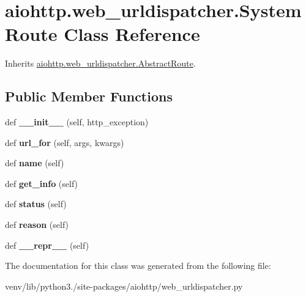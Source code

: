\hypertarget{classaiohttp_1_1web__urldispatcher_1_1_system_route}{}\section{aiohttp.\+web\+\_\+urldispatcher.\+System\+Route Class Reference}
\label{classaiohttp_1_1web__urldispatcher_1_1_system_route}


Inherits \hyperlink{classaiohttp_1_1web__urldispatcher_1_1_abstract_route}{aiohttp.\+web\+\_\+urldispatcher.\+Abstract\+Route}.

\subsection*{Public Member Functions}
\begin{DoxyCompactItemize}
\item 
\mbox{\label{classaiohttp_1_1web__urldispatcher_1_1_system_route_a6053bf8d2c9137e23233f72ac0ad2043}} 
def {\bfseries \+\_\+\+\_\+init\+\_\+\+\_\+} (self, http\+\_\+exception)
\item 
\mbox{\label{classaiohttp_1_1web__urldispatcher_1_1_system_route_aef2c28b3e6d68bb4a1e99d4c1686b421}} 
def {\bfseries url\+\_\+for} (self, args, kwargs)
\item 
\mbox{\label{classaiohttp_1_1web__urldispatcher_1_1_system_route_ac1e66622d61ce49226476097b1b94b00}} 
def {\bfseries name} (self)
\item 
\mbox{\label{classaiohttp_1_1web__urldispatcher_1_1_system_route_acaf983acee5acecf95944949b20490cc}} 
def {\bfseries get\+\_\+info} (self)
\item 
\mbox{\label{classaiohttp_1_1web__urldispatcher_1_1_system_route_ac25e9ba0f79394224bfad4533d54187a}} 
def {\bfseries status} (self)
\item 
\mbox{\label{classaiohttp_1_1web__urldispatcher_1_1_system_route_ab8f031efdceac0ed3544cc9631534e0a}} 
def {\bfseries reason} (self)
\item 
\mbox{\label{classaiohttp_1_1web__urldispatcher_1_1_system_route_a51f701efefa4081c224466baca9602e1}} 
def {\bfseries \+\_\+\+\_\+repr\+\_\+\+\_\+} (self)
\end{DoxyCompactItemize}


The documentation for this class was generated from the following file\+:\begin{DoxyCompactItemize}
\item 
venv/lib/python3./site-\/packages/aiohttp/web\+\_\+urldispatcher.\+py\end{DoxyCompactItemize}
